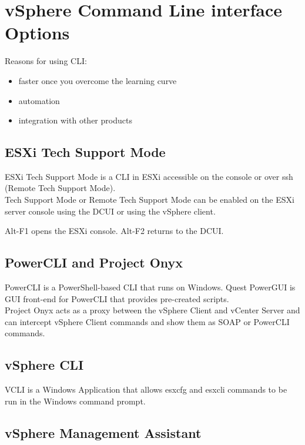 \section{vSphere Command Line interface Options}

Reasons for using CLI:

\begin{itemize}
\item faster once you overcome the learning curve
\item automation
\item integration with other products
\end{itemize}

\subsection{ESXi Tech Support Mode}

ESXi Tech Support Mode is a CLI in ESXi accessible on the console or over ssh
(Remote Tech Support Mode).\\

Tech Support Mode or Remote Tech Support Mode can be enabled on the ESXi
server console using the DCUI or using the vSphere client.

Alt-F1 opens the ESXi console. Alt-F2 returns to the DCUI.

\subsection{PowerCLI and Project Onyx}

PowerCLI is a PowerShell-based CLI that runs on Windows. Quest PowerGUI is
GUI front-end for PowerCLI that provides pre-created scripts.\\

Project Onyx acts as a proxy between the vSphere Client and vCenter Server
and can intercept vSphere Client commands and show them as SOAP or PowerCLI
commands.

\subsection{vSphere CLI}

VCLI is a Windows Application that allows esxcfg and esxcli commands to be
run in the Windows command prompt.

\subsection{vSphere Management Assistant}

